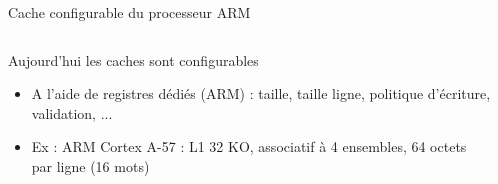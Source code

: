 %


\begin{Frame}{Cache configurable du processeur ARM}
  \begin{columns}[t]
    \begin{column}{.4\textwidth} %
      \begin{block}{Aujourd'hui les caches sont configurables}
        \begin{itemize}
        \item A l'aide de registres dédiés (ARM) : taille, taille ligne,
          politique d'écriture, validation, ...
        \item Ex : ARM Cortex A-57 : L1 32 KO, associatif à 4 ensembles,
          64 octets par ligne (16 mots)
        \end{itemize}
      \end{block}   
    \end{column}
    \begin{column}{.5\textwidth} %
      \begin{block}{}
      \end{block}
    \end{column}
  \end{columns}
\end{Frame}


